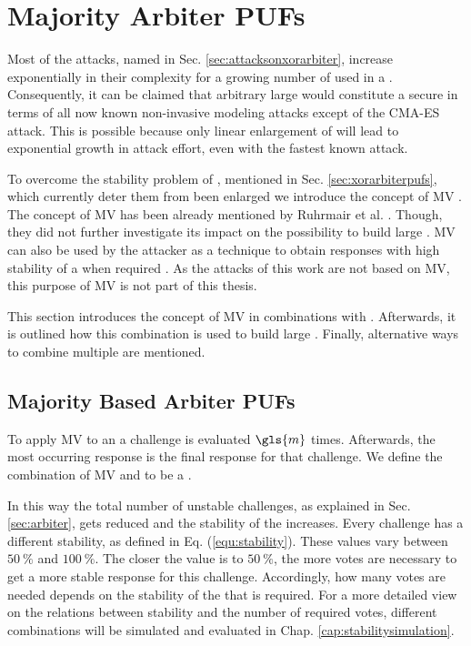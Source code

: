 \chapter{Majority Arbiter PUFs}
\label{cap:majorityarbiter}

Most of the attacks, named in Sec. \ref{sec:attacksonxorarbiter}, increase exponentially in their complexity for a growing number of used \apufs in a \xpuf.  %
Consequently, it can be claimed that arbitrary large \xpufs would constitute a secure \puf in terms of all now known non-invasive modeling attacks except of the \ac{CMA-ES} attack.
This is possible because only linear enlargement of \xpufs will lead to exponential growth in attack effort, even with the fastest known attack.

To overcome the stability problem of \xpufs, mentioned in Sec. \ref{sec:xorarbiterpufs}, which currently deter them from been enlarged we introduce the concept of \ac{MV} \cite{Majzoobi2010FPGALines}. %
The concept of \ac{MV} has been already mentioned by Ruhrmair et al. \cite{Ruhrmair2013PUFData}.
Though, they did not further investigate its impact on the possibility to build large \xpufs. %
\ac{MV} can also be used by the attacker as a technique to obtain responses with high stability of a \puf when required \cite{Ganji2016PACPUFs, Ozturk2008TowardsDevices}.
As the attacks of this work are not based on \ac{MV}, this purpose of \ac{MV} is not part of this thesis.

This section introduces the concept of \ac{MV} in combinations with \apufs.
Afterwards, it is outlined how this combination is used to build large \xpufs.
Finally, alternative ways to combine multiple \apufs are mentioned.


\section{Majority Based Arbiter PUFs}
\label{sec:majorityarbiter}

To apply \ac{MV} to an \apuf a challenge is evaluated $\gls{m}$ times.
Afterwards, the most occurring response is the final response for that challenge.
We define the combination of \ac{MV} and \apuf to be a \mpuf.

In this way the total number of unstable challenges, as explained in Sec. \ref{sec:arbiter}, gets reduced and the stability of the \apuf increases. %
Every challenge has a different stability, as defined in Eq. (\ref{equ:stability}).%
These values vary between $50\ \%$ and $100\ \%$.
The closer the value is to $50\ \%$, the more votes are necessary to get a more stable response for this challenge. %
Accordingly, how many votes are needed depends on the stability of the \apuf that is required. 
For a more detailed view on the relations between stability and the number of required votes, different combinations will be simulated and evaluated in Chap. \ref{cap:stabilitysimulation}.

